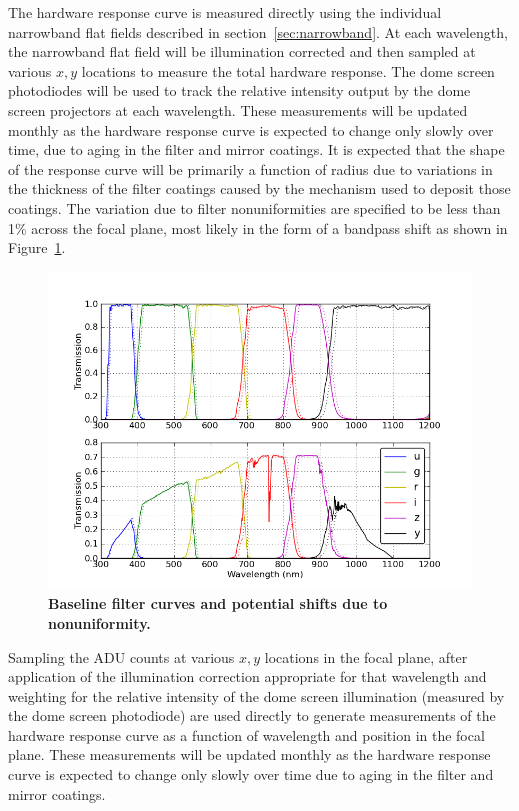 \documentclass[12pt,preprint]{aastex}
\begin{document}
The hardware response curve is measured directly using the individual
narrowband flat fields described in section~\ref{sec:narrowband}. At
each wavelength, the narrowband flat field will be illumination
corrected and then sampled at various $x,y$ locations to measure the
total hardware response. The dome screen photodiodes will be used to
track the relative intensity output by the dome screen projectors at
each wavelength. These measurements will be updated monthly as the
hardware response curve is expected to change only slowly over time,
due to aging in the filter and mirror coatings. It is expected that the
shape of the response curve will be primarily a function of radius due to
variations in the thickness of the filter coatings caused by the mechanism
used to deposit those coatings. The variation due to filter nonuniformities
are specified to be less than 1\% across the focal plane, most likely in 
the form of a bandpass shift as shown in Figure~\ref{fig:filtershift}. 

\begin{figure}
\begin{center}
\includegraphics[width=6in]{filter_shifts}
\end{center}
\caption{ {\small
{\bf Baseline filter curves and potential shifts due to nonuniformity.}
\label{fig:filtershift}
} }
\end{figure}


Sampling the ADU counts at various $x,y$ locations in the focal plane, 
after application of the illumination correction appropriate for that wavelength
and weighting for the relative intensity of the dome screen illumination 
(measured by the dome screen photodiode)
 are used directly to generate measurements of the
hardware response curve as a function of wavelength and position in
the focal plane. These measurements will be updated monthly as the
hardware response curve is expected to change only slowly over time
due to aging in the filter and mirror coatings.
\end{document}
